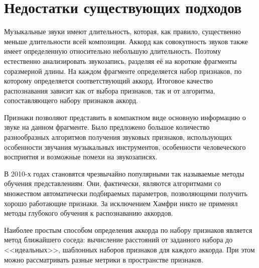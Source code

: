 \section{Недостатки существующих подходов} \label{sect_weak}

Музыкальные звуки имеют длительность, которая, как правило, существенно меньше
длительности всей композиции. Аккорд как совокупность звуков также имеет
определенную относительно небольшую длительность. Поэтому естественно
анализировать звукозапись, разделяя её на короткие фрагменты соразмерной длины.
На каждом фрагменте определяется набор признаков, по которому определяется
соответствующий аккорд. Итоговое качество распознавания зависит как от выбора
признаков, так и от алгоритма, сопоставляющего набору признаков аккорд.

Признаки позволяют представить в компактном виде основную информацию о звуке на
данном фрагменте. Было предложено большое количество разнообразных алгоритмов
получения звуковых признаков, использующих особенности звучания музыкальных
инструментов, особенности человеческого восприятия и возможные помехи на
звукозаписях.

В 2010-х годах становятся чрезвычайно популярными так называемые методы
обучения представлениям. Они, фактически, являются алгоритмами со множеством
автоматически подбираемых параметров, позволяющими получить хорошо работающие
признаки. За исключением Хамфри \cite{Humphrey2012} никто не применял методы
глубокого обучения к распознаванию аккордов.

Наиболее простым способом определения аккорда по набору признаков является метод
ближайшего соседа: вычисление расстояний от заданного набора до <<идеальных>>,
шаблонных наборов признаков для каждого аккорда. При этом можно рассматривать
разные метрики в пространстве признаков.

